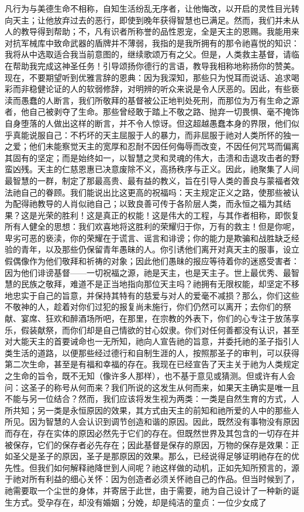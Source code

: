 凡行为与美德生命不相称，自知生活纷乱无序者，让他悔改，以开启的灵性目光转向天主；让他放弃过去的恶行，即使到晚年获得智慧也已满足。然而，我们并未从人的教导得到帮助；不，凡有识者所称誉的品性恩宠，全是天主的恩赐。我能用来对抗军械库中致命武器的盾牌并不薄弱，我指的是我所拥有的那令祂喜悦的知识：我将从中选取适合我当前意图的，继续歌颂万有之父。但是，人类救主基督，请临在帮助我完成这神圣任务！引导颂扬你德行的言语，教导我相称地称扬你的赞美。现在，不要期望听到优雅言辞的恩典：因为我深知，那些只为悦耳而说话、追求喝彩而非稳健论证的人的软弱修辞，对明辨的听众来说是令人厌恶的。因此，有些亵渎而愚蠢的人断言，我们所敬拜的基督被公正地判处死刑，而那位为万有生命之源者，他自己被剥夺了生命。那些曾经敢于踏上不敬之路、抛弃一切畏惧、毫不掩饰自身堕落的人做出这样的断言，并不令人惊讶。但这超越愚蠢本身的界限，他们似乎真能说服自己：不朽坏的天主屈服于人的暴力，而非屈服于祂对人类所怀的独一之爱；他们未能察觉天主的宽厚和忍耐不因任何侮辱而改变，不因任何咒骂而偏离其固有的坚定；而是始终如一，以智慧之灵和灵魂的伟大，击溃和击退攻击者的野蛮凶残。天主的仁慈恩惠已决意废除不义，高扬秩序与正义。因此，祂聚集了人间最智慧的一群，制定了那最高贵、最有益的教义，旨在引导人类的善良与蒙福者效法祂自己的眷顾。我们能说出比这更高的祝福吗：天主规定正义之路，使那些被认为配得祂教导的人肖似祂自己；以致良善可传于各阶层人类，而永恒之福为其结果？这是光荣的胜利！这是真正的权能！这是伟大的工程，与其作者相称，即恢复所有人健全的思想：我们欢喜地将这胜利的荣耀归于你，万有的救主！但是你呢，卑劣可恶的亵渎，你的荣耀在于谎言、谣言和诽谤；你的能力是欺骗和战胜缺乏经验的青年，以及那些仍保留青年愚昧的人。你引诱他们离开对真天主的服事，设立假偶像作为他们敬拜和祈祷的对象；因此他们愚昧的报应等待着你的迷惑受害者：因为他们诽谤基督——一切祝福之源，祂是天主，也是天主子。世上最优秀、最智慧的民族之敬拜，难道不是正当地指向那位天主吗？祂拥有无限权能，却坚定不移地忠实于自己的旨意，并保持其特有的慈爱与对人的爱毫不减损？那么，你们这些不敬神的人，趁着对你们过犯的报复尚未施行，你们仍然可以离开；去你们的祭献、宴席、狂欢和醉酒场所吧，在那里，在宗教的外表下，你们的心专注于放荡享乐，假装献祭，而你们却是自己情欲的甘心奴隶。你们对任何善都没有认识，甚至对大能天主的首要诫命也一无所知，祂向人宣告祂的旨意，并委托祂的圣子指引人类生活的道路，以便那些经过德行和自制生涯的人，按照那圣子的审判，可以获得第二次生命，甚至是有福和幸福的存在。我现在已经宣告了天主关于祂为人类规定之生命的旨令，既不无知（像许多人那样），也不基于意见或猜测。但或许有人会问：这圣子的称号从何而来？我们所说的这发生从何而来，如果天主确实是唯一且不能与另一位结合？然而，我们应该将发生视为两类：一类是自然生育的方式，人所共知；另一类是永恒原因的效果，其方式由天主的前知和祂所爱的人中的那些人所见。因为智慧的人会认识到调节创造和谐的原因。因此，既然没有事物没有原因而存在，存在实体的原因必然先于它们的存在。但既然世界及其包含的一切存在并被保存，它们的保存者必先存在；因此基督是保存的原因，万物的保存是效果：正如圣父是圣子的原因，圣子是那原因的效果。那么，已经说得足够证明祂存在的优先性。但我们如何解释祂降世到人间呢？祂这样做的动机，正如先知所预言的，源于祂对所有利益的细心关怀：因为创造者必须关怀祂自己的作品。但当时候到了，祂需要取一个尘世的身体，并寄居于此世，由于需要，祂为自己设计了一种新的诞生方式。受孕存在，却没有婚姻；分娩，却是纯洁的童贞：一位少女成了